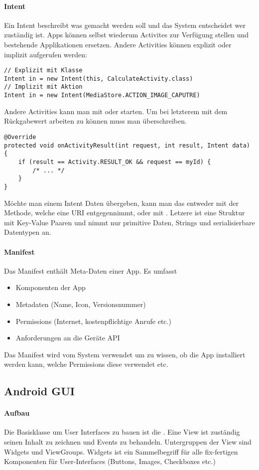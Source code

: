 \paragraph{Intent} Ein Intent beschreibt was gemacht werden soll und das System entscheidet wer zuständig ist. Apps können selbst wiederum Activites zur Verfügung stellen und bestehende Applikationen ersetzen. Andere Activities können explizit oder implizit aufgerufen werden:
\begin{lstlisting}
// Explizit mit Klasse
Intent in = new Intent(this, CalculateActivity.class)
// Implizit mit Aktion
Intent in = new Intent(MediaStore.ACTION_IMAGE_CAPUTRE)
\end{lstlisting}
Andere Activities kann man mit  oder  starten. Um bei letzterem mit dem Rückgabewert arbeiten zu können muss man  überschreiben.
\begin{lstlisting}
@Override
protected void onActivityResult(int request, int result, Intent data) {
    if (result == Activity.RESULT_OK && request == myId) {
        /* ... */
    }
}
\end{lstlisting}
Möchte man einem Intent Daten übergeben, kann man das entweder mit der  Methode, welche eine URI entgegennimmt, oder mit . Letzere ist eine Struktur mit Key-Value Paaren und nimmt nur primitive Daten, Strings und serialisierbare Datentypen an.
\paragraph{Manifest} Das Manifest enthält Meta-Daten einer App. Es umfasst
\begin{itemize}
\item Komponenten der App
\item Metadaten (Name, Icon, Versionsnummer)
\item Permissions (Internet, kostenpflichtige Anrufe etc.)
\item Anforderungen an die Geräte API
\end{itemize}
Das Manifest wird vom System verwendet um zu wissen, ob die App installiert werden kann, welche Permissions diese verwendet etc.
\subsection{Android GUI}
\paragraph{Aufbau} Die Basisklasse um User Interfaces zu bauen ist die . Eine View ist zuständig seinen Inhalt zu zeichnen und Events zu behandeln. Untergruppen der View sind Widgets und ViewGroups. Widgets ist ein Sammelbegriff für alle fix-fertigen Komponenten für User-Interfaces (Buttons, Images, Checkboxes etc.)
